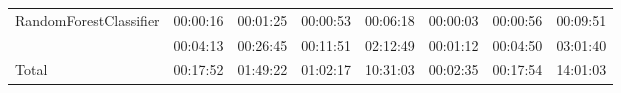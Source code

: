 \begin{table}[H]
{\begin{tabular}{llllllll}
        \multicolumn{1}{l|}{RandomForestClassifier}                         & 00:00:16 & 00:01:25                      & 00:00:53 & 00:06:18                      & 00:00:03 & 00:00:56                      & 00:09:51                \\
        \rowcolor[HTML]{EFEFEF} 
        \multicolumn{1}{l|}{\cellcolor[HTML]{EFEFEF}XGBClassifier}          & 00:04:13 & 00:26:45                      & 00:11:51 & 02:12:49                      & 00:01:12 & 00:04:50                      & 03:01:40                \\
        \multicolumn{1}{l|}{Total}                                          & 00:17:52 & 01:49:22                      & 01:02:17 & 10:31:03                      & 00:02:35 & 00:17:54                      & 14:01:03               
    \end{tabular}}
\end{table}

